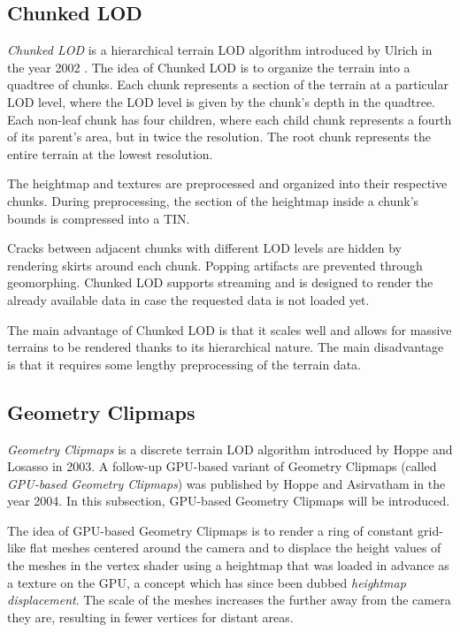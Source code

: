 \subsection{Chunked LOD}
\textit{Chunked LOD} is a hierarchical terrain LOD algorithm 
introduced by Ulrich in the year 2002 \cite{chunkedlod}. 
The idea of Chunked LOD is to organize the terrain 
into a quadtree of chunks.
Each chunk represents a section of the terrain at a particular LOD level,
where the LOD level is given by the chunk's depth in the quadtree.
Each non-leaf chunk has four children, where each child chunk
represents a fourth of its parent's area, but in twice the resolution.
The root chunk represents the entire terrain at the lowest resolution.

The heightmap and textures are preprocessed and organized 
into their respective chunks.
During preprocessing, the section of the heightmap inside 
a chunk's bounds is compressed into a TIN.

Cracks between adjacent chunks with different LOD levels are 
hidden by rendering skirts around each chunk. Popping artifacts are prevented 
through geomorphing.
Chunked LOD supports streaming
and is designed to render the already available data in case 
the requested data is not loaded yet.

The main advantage of Chunked LOD is that 
it scales well and allows for massive terrains to be rendered
thanks to its hierarchical nature. The main disadvantage 
is that it requires some lengthy preprocessing of the terrain data.

\subsection{Geometry Clipmaps}
\textit{Geometry Clipmaps} is a discrete terrain LOD algorithm 
introduced by Hoppe and Losasso in 2003. A follow-up GPU-based 
variant of Geometry Clipmaps (called \textit{GPU-based Geometry Clipmaps}) was published by Hoppe and Asirvatham \cite{gpugeomclipmaps}
in the year 2004. In this subsection, GPU-based Geometry Clipmaps will be 
introduced.

The idea of GPU-based Geometry Clipmaps is to render a ring of constant grid-like flat meshes
centered around the camera and to displace the height values of the meshes in the vertex shader
using a heightmap that was loaded in advance as a texture on the GPU, a concept which has 
since been dubbed \textit{heightmap displacement}.
The scale of the meshes increases the further away from the camera they are,
resulting in fewer vertices for distant areas.

